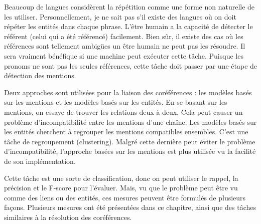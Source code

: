 \documentclass{KodeBook}
\begin{document}
\begin{discussion}
Beaucoup de langues considèrent la répétition comme une forme non naturelle de les utiliser. 
Personnellement, je ne sait pas s'il existe des langues où on doit répéter les entités dans chaque phrase. 
L'être humain a la capacité de détecter le référent (celui qui a été référencé) facilement. 
Bien sûr, il existe des cas où les références sont tellement ambigües un être humain ne peut pas les résoudre. 
Il sera vraiment bénéfique si une machine peut exécuter cette tâche. 
Puisque les pronoms ne sont pas les seules références, cette tâche doit passer par une étape de détection des mentions. 

Deux approches sont utilisées pour la liaison des coréférences : les modèles basés sur les mentions et les modèles basés sur les entités. 
En se basant sur les mentions, on essaye de trouver les relations deux à deux.
Cela peut causer un problème d'incompatibilité entre les mentions d'une chaîne. 
Les modèles basés sur les entités cherchent à regrouper les mentions compatibles ensembles. 
C'est une tâche de regroupement (clustering). 
Malgré cette dernière peut éviter le problème d'incompatibilité, l'approche basées sur les mentions est plus utilisée vu la facilité de son implémentation. 

Cette tâche est une sorte de classification, donc on peut utiliser le rappel, la précision et le F-score pour l'évaluer. 
Mais, vu que le problème peut être vu comme des liens ou des entités, ces mesures peuvent être formulés de plusieurs façons. 
Plusieurs mesures ont été présentées dans ce chapitre, ainsi que des tâches similaires à la  résolution des coréférences.
\end{discussion}

\ifx\wholebook\relax\else
% 
% 
	
\end{document}
